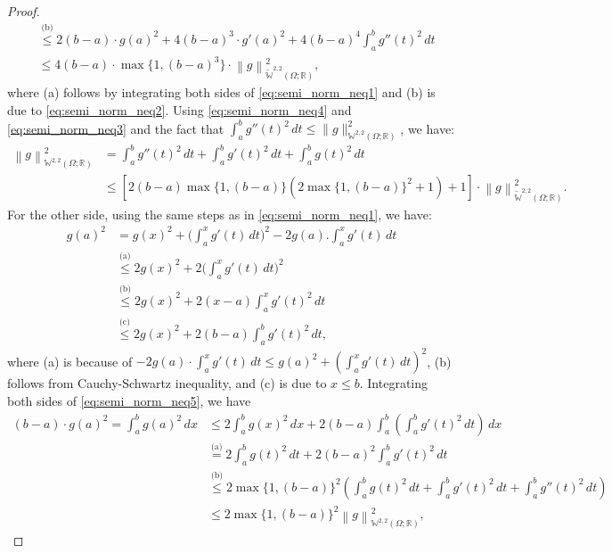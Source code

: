 \documentclass{article}
\newcommand{\norm}[1]{\left\lVert#1\right\rVert}
\newcommand{\sob}[2]{\mathbb{W}^{#1,#2}\left(\Omega; \mathbb{R}\right)}
\newcommand{\sobeq}[2]{\widetilde{\mathbb{W}}^{#1,#2}\left(\Omega; \mathbb{R}\right)}
\newcommand{\lec}[2]{\stackrel{\text{#1}}{#2}}
\begin{document}
\begin{proof}
\begin{align}
        &\lec{(b)}{\leqslant} 2(b-a)\cdot g(a)^2 + 4(b-a)^3\cdot g'(a)^2 + 4(b-a)^4 \int_a^b g''(t)^2\,dt \nonumber \\ 
        &\leqslant 4(b-a)\cdot\max\{1, (b-a)^3\}\cdot\norm{g}^2_{\sobeq{2}{2}},
    \end{align}
    where (a) follows by integrating both sides of \eqref{eq:semi_norm_neq1} and (b) is due to \eqref{eq:semi_norm_neq2}. Using \eqref{eq:semi_norm_neq4} and \eqref{eq:semi_norm_neq3} and the fact that $\int_a^b g''(t)^2\, dt \leqslant \|g\|^2_{\sob{2}{2}}$, we have:
    \begin{align}
        \norm{g}^2_{\sob{2}{2}} &= \int_a^b g''(t)^2\, dt +  \int_a^b g'(t)^2\, dt + \int_a^b g(t)^2\, dt \nonumber \\  &\leqslant \left[2(b-a)\max\{1, (b-a)\} \left (2\max\{1, (b-a)\}^2 + 1 \right) +1\right] \cdot\norm{g}^2_{\sobeq{2}{2}}.
    \end{align}
    For the other side, using the same steps as in \eqref{eq:semi_norm_neq1}, we have:
    \begin{align}\label{eq:semi_norm_neq5}
        g(a)^2 &= g(x)^2 + \biggl(\int_a^x g'(t)\,dt \biggr)^2 - 2g(a).\int_a^x g'(t)\,dt \nonumber \\ 
        &\lec{(a)}{\leqslant} 2g(x)^2 + 2\biggl(\int_a^x g'(t)\,dt \biggr)^2 \nonumber \\
        &\lec{(b)}{\leqslant} 2g(x)^2 + 2(x-a)\int_a^x g'(t)^2\,dt \nonumber \\  
        &\lec{(c)}{\leqslant}  2g(x)^2 + 2(b-a)\int_a^b g'(t)^2\,dt,
    \end{align}
    where (a) is because of $-2g(a)\cdot\int_a^x g'(t)\,dt \leqslant g(a)^2 + \left(\int_a^x g'(t)\,dt \right)^2$, (b) follows from Cauchy-Schwartz inequality, and (c) is due to $x \leqslant b$. Integrating both sides of \eqref{eq:semi_norm_neq5}, we have
    \begin{align}\label{eq:semi_norm_neq6}
         (b-a)\cdot g(a)^2 = \int_a^b g(a)^2\,dx  &\leqslant 2\int_a^b g(x)^2\,dx + 2(b-a)\int_a^b \left(\int_a^b g'(t)^2\,dt \right)\,dx \nonumber \\ 
        &\lec{(a)}{=} 2\int_a^b g(t)^2\,dt + 2(b-a)^2 \int_a^b g'(t)^2\,dt \nonumber \\
        &\lec{(b)}{\leqslant} 2\max\{1, (b-a)\}^2\left(\int_a^b g(t)^2\,dt + \int_a^b g'(t)^2\,dt + \int_a^b g''(t)^2\,dt\right) \nonumber \\
        &\leqslant 2\max\{1, (b-a)\}^2 \norm{g}^2_{\sob{2}{2}},
    \end{align}

\end{proof}
\end{document}
